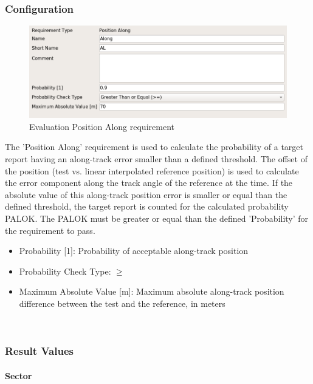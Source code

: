 \subsubsection{Configuration}

\begin{figure}[H]
    \includegraphics[width=14cm,frame]{figures/eval_req_pos_along.png}
  \caption{Evaluation Position Along requirement}
\end{figure}

The 'Position Along' requirement is used to calculate the probability of a target report having an along-track error smaller than a defined threshold. The offset of the position (test vs. linear interpolated reference position) is used to calculate the error component along the track angle of the reference at the time. If the absolute value of this along-track position error is smaller or equal than the defined threshold, the target report is counted for the calculated probability PALOK. The PALOK must be greater or equal than the defined 'Probability' for the requirement to pass. \\

\begin{itemize}  
\item Probability [1]: Probability of acceptable along-track position
\item Probability Check Type: $\geq$
\item Maximum Absolute Value [m]: Maximum absolute along-track position difference between the test and the reference, in meters
\end{itemize}
\ \\

\subsubsection{Result Values}

\paragraph{Sector}

